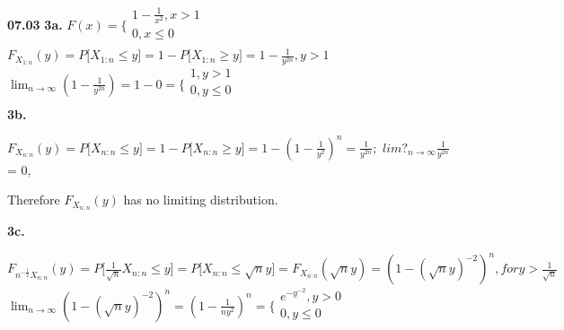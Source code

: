 
{\bf 07.03}
\textbf{3a.}
$F(x)=\bigg\{ 
\begin{gathered}
1-\frac{1}{x^{2}}, x>1 \\
0, x\le 0 \\
\end{gathered}
$\\




$F_{X_{1:n}}(y)= P\lbrack X_{1:n} \le y\rbrack = 1- P\lbrack X_{1:n} 
\ge y\rbrack =1-\frac{1}{y^{2n}} , y>1$\\


$\lim _{n\to \infty }(1-\frac{1}{y^{2n}})=1-0= \bigg\{ 
\begin{gathered}
1, y>1 \\
0, y\le 0 \\
\end{gathered}
$\\




\textbf{3b.}



$F_{X_{n:n}}(y)= P\lbrack X_{n:n} \le y\rbrack =1-P\lbrack X_{n:n} \ge 
y\rbrack = 1-(1-\frac{1}{y^{2}})^{n}= \frac{1}{y^{2n }} ;$ $lim?_{n\to 
\infty } \frac{1}{y^{2n }}$ = 0,

Therefore $F_{X_{n:n}}(y)$ has no limiting distribution.



\textbf{3c.}

$F_{n^{-\frac{1}{2 }}X_{n:n}}(y)= P\lbrack \frac{1}{\sqrt{n}}X_{n:n} 
\le y\rbrack = P\lbrack X_{n:n} \le \sqrt{n}y\rbrack 
=F_{X_{n:n}}(\sqrt{n}y) =(1- (\sqrt{n}y)^{-2})^{n}, for 
y>\frac{1}{\sqrt{n}}$\\


$\lim _{n\to \infty }(1- (\sqrt{n}y)^{-2})^{n}= 
(1-\frac{1}{ny^{2}})^{n}=\bigg\{ 
\begin{gathered}
 e^{-y^{-2}}, y>0 \\
0, y\le 0 \\
\end{gathered}
 $\\